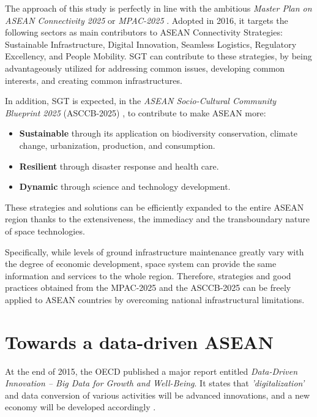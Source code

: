 \vspace{0.4 cm}

The approach of this study is perfectly in line with the ambitious \textit{Master Plan on ASEAN Connectivity 2025} or \textit{MPAC-2025} \cite{mpac}. Adopted in 2016, it targets the following sectors as main contributors to ASEAN Connectivity Strategies: Sustainable Infrastructure, Digital Innovation, Seamless Logistics, Regulatory Excellency, and People Mobility. SGT can contribute to these strategies, by being advantageously utilized for addressing common issues, developing common interests, and creating common infrastructures.

\vspace{0.4 cm}

In addition, SGT is expected, in the \textit{ASEAN Socio-Cultural Community Blueprint 2025} (ASCCB-2025) \cite{asccb}, to contribute to make ASEAN more:

\begin{itemize}
\item \textbf{Sustainable} through its application on biodiversity conservation, climate change, urbanization, production, and consumption.
\item \textbf{Resilient} through disaster response and health care. 
\item \textbf{Dynamic} through science and technology development.
\end{itemize}

These strategies and solutions can be efficiently expanded to the entire ASEAN region thanks to the extensiveness, the immediacy and the transboundary nature of space technologies.

\vspace{0.4 cm}

Specifically, while levels of ground infrastructure maintenance greatly vary with the degree of economic development, space system can provide the same information and services to the whole region. Therefore, strategies and good practices obtained from the MPAC-2025 and the ASCCB-2025 can be freely applied to ASEAN countries by overcoming national infrastructural limitations.


\section{Towards a data-driven ASEAN}

\tab At the end of 2015, the OECD published a major report entitled \textit{Data-Driven Innovation -- Big Data for Growth and Well-Being}. It states that \textit{'digitalization'} and data conversion of various activities will be advanced innovations, and a new economy will be developed accordingly \cite{oecd_ddi}.


